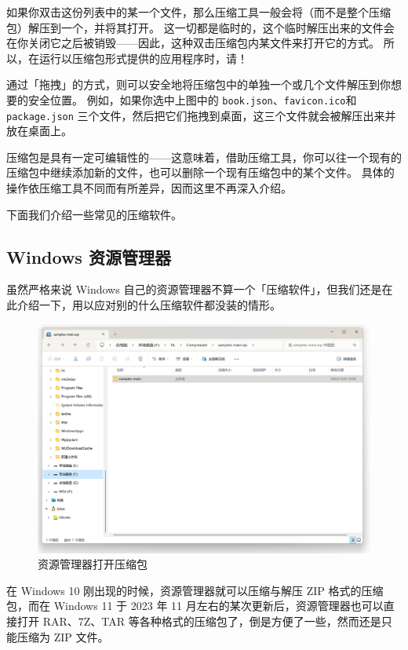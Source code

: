 如果你双击这份列表中的某一个文件，那么压缩工具一般会将（而不是整个压缩包）解压到一个，并将其打开。
这一切都是临时的，这个临时解压出来的文件会在你关闭它之后被销毁——因此，这种双击压缩包内某文件来打开它的方式。
所以，在运行以压缩包形式提供的应用程序时，请！

通过「拖拽」的方式，则可以安全地将压缩包中的单独一个或几个文件解压到你想要的安全位置。
例如，如果你选中上图中的 \verb|book.json|、\verb|favicon.ico|和 \verb|package.json| 三个文件，然后把它们拖拽到桌面，这三个文件就会被解压出来并放在桌面上。

\begin{note}
  压缩包是具有一定可编辑性的——这意味着，借助压缩工具，你可以往一个现有的压缩包中继续添加新的文件，也可以删除一个现有压缩包中的某个文件。
  具体的操作依压缩工具不同而有所差异，因而这里不再深入介绍。
\end{note}

下面我们介绍一些常见的压缩软件。

\subsection{Windows 资源管理器}

虽然严格来说 Windows 自己的资源管理器不算一个「压缩软件」，但我们还是在此介绍一下，用以应对别的什么压缩软件都没装的情形。

\begin{figure}[htb!]
  \centering
  \includegraphics[width=.7\textwidth]{assets/explorer-open-zip.png}
  \caption{资源管理器打开压缩包}
  \label{explorer-open-zip}
\end{figure}

在 Windows 10 刚出现的时候，资源管理器就可以压缩与解压 ZIP 格式的压缩包，而在 Windows 11 于 2023 年 11 月左右的某次更新后，资源管理器也可以直接打开 RAR、7Z、TAR 等各种格式的压缩包了，倒是方便了一些，然而还是只能压缩为 ZIP 文件。

